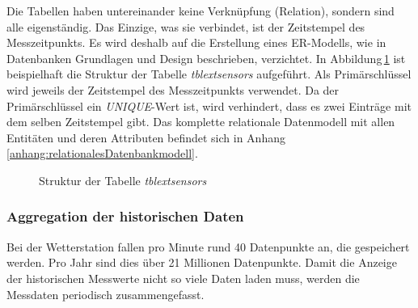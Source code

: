 \noindent
Die Tabellen haben untereinander keine Verknüpfung (Relation), sondern sind alle eigenständig. Das Einzige, was sie verbindet, ist der Zeitstempel des Messzeitpunkts. Es wird deshalb auf die Erstellung eines ER-Modells, wie in Datenbanken Grundlagen und Design \cite{FrankGeisler2011mitpu} beschrieben, verzichtet. In Abbildung\,\ref{img:tabellenstruktur} ist beispielhaft die Struktur der Tabelle \emph{tblextsensors} aufgeführt. Als Primärschlüssel wird jeweils der Zeitstempel des Messzeitpunkts verwendet. Da der Primärschlüssel ein \emph{UNIQUE}-Wert ist, wird verhindert, dass es zwei Einträge mit dem selben Zeitstempel gibt. Das komplette relationale Datenmodell mit allen Entitäten und deren Attributen befindet sich in Anhang\,\ref{anhang:relationalesDatenbankmodell}.

\begin{figure}[htbp!]
	\centering
	\caption{Struktur der Tabelle \emph{tblextsensors}}
	\label{img:tabellenstruktur}
\end{figure}



\subsubsection{Aggregation der historischen Daten}
\label{kap:aggregation}
Bei der Wetterstation fallen pro Minute rund 40 Datenpunkte an, die gespeichert werden. Pro Jahr sind dies über 21 Millionen Datenpunkte. Damit die Anzeige der historischen Messwerte nicht so viele Daten laden muss, werden die Messdaten periodisch zusammengefasst.

